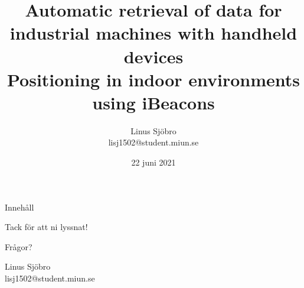 \documentclass{beamer}
\title{Automatic retrieval of data for industrial machines with handheld devices \\
  \large{Positioning in indoor environments using iBeacons}}
\date{22 juni 2021}
\author{Linus Sjöbro \\ \tiny{lisj1502@student.miun.se}}
\institute{Mittuniversitetet Sundsvall \figNoCap{0.3}{miunLogo}}
\begin{document}
  \maketitle
  
  \begin{frame}{Innehåll}
    \tableofcontents 
  \end{frame}

  
  
  
  
  
  

  \begin{frame}[standout]
    Tack för att ni lyssnat!
    
    Frågor?

    \small{Linus Sjöbro\\lisj1502@student.miun.se}
  \end{frame}
\end{document}
